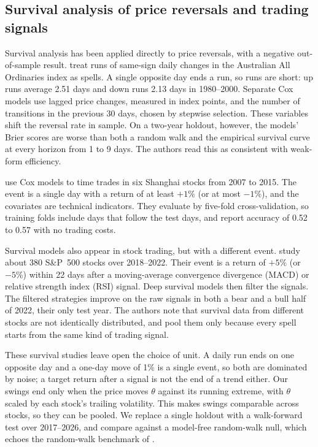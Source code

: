 \subsection{Survival analysis of price reversals and trading signals}

Survival analysis has been applied directly to price reversals, with a negative out-of-sample
result. \citet{Yao2005} treat runs of same-sign daily changes in the Australian All Ordinaries index
as spells. A single opposite day ends a run, so runs are short: up runs average 2.51 days and down
runs 2.13 days in 1980--2000. Separate Cox models use lagged price changes, measured in index points,
and the number of transitions in the previous 30 days, chosen by stepwise selection. These variables
shift the reversal rate in sample. On a two-year holdout, however, the models' Brier scores are
worse than both a random walk and the empirical survival curve at every horizon from 1 to 9 days.
The authors read this as consistent with weak-form efficiency.

\citet{Gao2015} use Cox models to time trades in six Shanghai stocks from 2007 to 2015. The event
is a single day with a return of at least $+1\%$ (or at most $-1\%$), and the covariates are
technical indicators. They evaluate by five-fold cross-validation, so training folds include days
that follow the test days, and report accuracy of 0.52 to 0.57 with no trading costs.

Survival models also appear in stock trading, but with a different event. \citet{HuZhou2024} study
about 380 S\&P~500 stocks over 2018--2022. Their event is a return of $+5\%$ (or $-5\%$) within 22
days after a moving-average convergence divergence (MACD) or relative strength index (RSI) signal.
Deep survival models then filter the signals. The filtered strategies improve on the raw signals in
both a bear and a bull half of 2022, their only test year. The authors note that survival data from
different stocks are not identically distributed, and pool them only because every spell starts
from the same kind of trading signal.

These survival studies leave open the choice of unit. A daily run ends on one opposite day and a
one-day move of 1\% is a single event, so both are dominated by noise; a target return after a
signal is not the end of a trend either. Our swings end only
when the price moves $\theta$ against its running extreme, with $\theta$ scaled by each stock's
trailing volatility. This makes swings comparable across stocks, so they can be pooled. We
replace a single holdout with a walk-forward test over 2017--2026, and compare against a
model-free random-walk null, which echoes the random-walk benchmark of \citet{Yao2005}.

